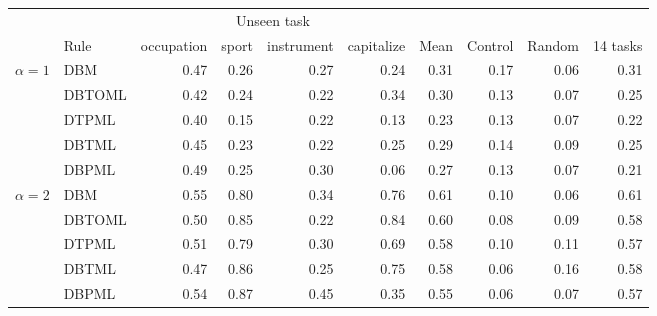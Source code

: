 \begin{tabular}{@{}llrrrrrrrr@{}}
\toprule
 & & \multicolumn{4}{c}{Unseen task} & & & & \\
\cmidrule(lr){3-6}
& Rule & occupation & sport & instrument & capitalize & Mean & Control & Random & 14 tasks \\
\midrule
$\alpha=1$ & DBM & 0.47 & 0.26 & 0.27 & 0.24 & 0.31 & 0.17 & 0.06 & 0.31 \\
 & DBTOML & 0.42 & 0.24 & 0.22 & 0.34 & 0.30 & 0.13 & 0.07 & 0.25 \\
 & DTPML & 0.40 & 0.15 & 0.22 & 0.13 & 0.23 & 0.13 & 0.07 & 0.22 \\
 & DBTML & 0.45 & 0.23 & 0.22 & 0.25 & 0.29 & 0.14 & 0.09 & 0.25 \\
 & DBPML & 0.49 & 0.25 & 0.30 & 0.06 & 0.27 & 0.13 & 0.07 & 0.21 \\
\midrule
$\alpha=2$ & DBM & 0.55 & 0.80 & 0.34 & 0.76 & 0.61 & 0.10 & 0.06 & 0.61 \\
 & DBTOML & 0.50 & 0.85 & 0.22 & 0.84 & 0.60 & 0.08 & 0.09 & 0.58 \\
 & DTPML & 0.51 & 0.79 & 0.30 & 0.69 & 0.58 & 0.10 & 0.11 & 0.57 \\
 & DBTML & 0.47 & 0.86 & 0.25 & 0.75 & 0.58 & 0.06 & 0.16 & 0.58 \\
 & DBPML & 0.54 & 0.87 & 0.45 & 0.35 & 0.55 & 0.06 & 0.07 & 0.57 \\
\bottomrule
\end{tabular}
